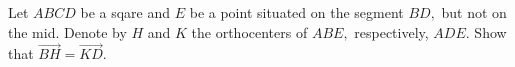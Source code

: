 Let $ ABCD $ be a sqare and $ E $ be a point situated on the segment $ BD, $ but not on the mid. Denote by $ H $ and $ K $ the orthocenters of $ ABE, $ respectively, $ ADE. $ Show that $ \overrightarrow{BH}=\overrightarrow{KD} . $